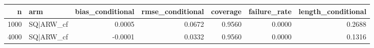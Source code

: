 \begin{tabular}{rlrrrrr}
\toprule
n & arm & bias\_conditional & rmse\_conditional & coverage & failure\_rate & length\_conditional \\
\midrule
1000 & SQ|ARW\_cf & 0.0005 & 0.0672 & 0.9560 & 0.0000 & 0.2688 \\
4000 & SQ|ARW\_cf & -0.0001 & 0.0332 & 0.9560 & 0.0000 & 0.1316 \\
\bottomrule
\end{tabular}
